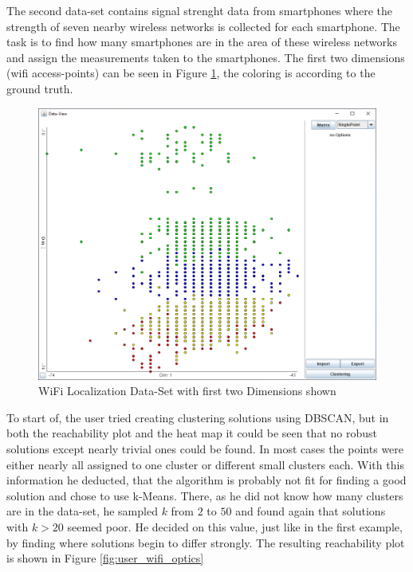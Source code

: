 \documentclass[
	a4paper,
	english,
	twoside,
	openright,               
	11pt                            
	]{report}
\begin{document}
The second data-set \cite{wireless} contains signal strenght data from smartphones where the strength of seven nearby wireless networks is collected for each smartphone. The task is to find how many smartphones are in the area of these wireless networks and assign the measurements taken to the smartphones. The first two dimensions (wifi access-points) can be seen in Figure \ref{fig:user_wifi_gt}, the coloring is according to the ground truth.

\begin{figure}[h]
	\centering
	\includegraphics[scale=.4]{user_wifi_gt}
	\caption{WiFi Localization Data-Set with first two Dimensions shown}
	\label{fig:user_wifi_gt}
\end{figure}

To start of, the user tried creating clustering solutions using DBSCAN, but in both the reachability plot and the heat map it could be seen that no robust solutions except nearly trivial ones could be found. In most cases the points were either nearly all assigned to one cluster or different small clusters each. With this information he deducted, that the algorithm is probably not fit for finding a good solution and chose to use k-Means. There, as he did not know how many clusters are in the data-set, he sampled $k$ from $2$ to $50$ and found again that solutions with $k>20$ seemed poor. He decided on this value, just like in the first example, by finding where solutions begin to differ strongly. The resulting reachability plot is shown in Figure \ref{fig:user_wifi_optics}
\end{document}
